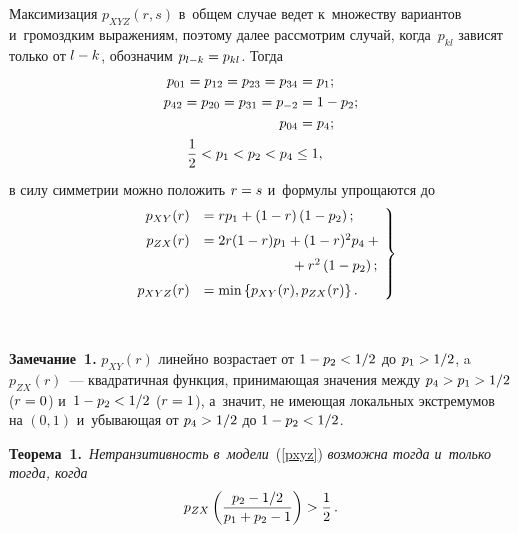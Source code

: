 \begin{multicols}{2}
Максимизация $p_{XYZ}(r,s)$ в~общем случае ведет к~множеству 
вариантов и~громоздким выражениям,
поэтому далее рассмотрим случай, когда~$p_{kl}$ зависят только от $l\hm-k$, 
обозначим $p_{l-k}\hm=p_{kl}$.
Тогда
\begin{align*}
p_{01}=p_{12}=p_{23}=p_{34}&=p_1;\\
p_{42}=p_{20}=p_{31}=p_{-2}&=1-p_2;\\
p_{04}&=p_4;\\
&\hspace*{-28mm}\fr{1}{2}<p_1<p_2<p_4\le 1,
\end{align*}
в силу симметрии можно положить $r\hm=s$ и~формулы упрощаются до
\begin{equation}
\left.
\begin{array}{rl}
p_{XY}(r)&=rp_1+(1-r)\left(1-p_2\right);\\[6pt]
p_{ZX}(r)&=2r(1-r)p_1+(1-r)^2p_4+{}\\[6pt]
&\hspace*{22mm}{}+r^2\left(1-p_2\right);\\[6pt]
p_{XYZ}(r)&=\min\left\{p_{XY}(r), p_{ZX}(r)\right\}.
\end{array}\!\!
\right\}\!\!
\label{pxyz}
\end{equation}

\begin{figure*}[b] %
 \vspace*{1pt}
    \begin{center}  
  \mbox{%
 \epsfxsize=163mm 
 }
\end{center}
\vspace*{-9pt}
\end{figure*}


\noindent
\textbf{Замечание~1.} $p_{XY}(r)$ линейно возрастает от $1\hm-p_2\hm<1/2$ до 
$p_1\hm>1/2$, a~$p_{ZX}(r)$~---
квадратичная функция, принимающая значения между $p_4\hm>p_1\hm>1/2$ ($r\hm=0$) 
и~$1\hm-p_2\hm<1/2$ ($r\hm=1$),
а~значит, не имеющая локальных экстремумов на $(0,1)$ и~убывающая от 
$p_4\hm>1/2$ до $1\hm-p_2\hm<1/2$.

\smallskip

\noindent
\textbf{Теорема~1.}\ \textit{Нетранзитивность в~модели}~(\ref{pxyz}) 
\textit{возможна тогда и~только тогда, когда}
\begin{equation*}
p_{ZX}\left(\displaystyle\frac{\displaystyle p_2-1/2\mathstrut}{\displaystyle p_1+p_2-1\mathstrut}\right)>\displaystyle\frac{\displaystyle 1\mathstrut}{\displaystyle 2\mathstrut}\,.
\end{equation*}


\end{multicols}
